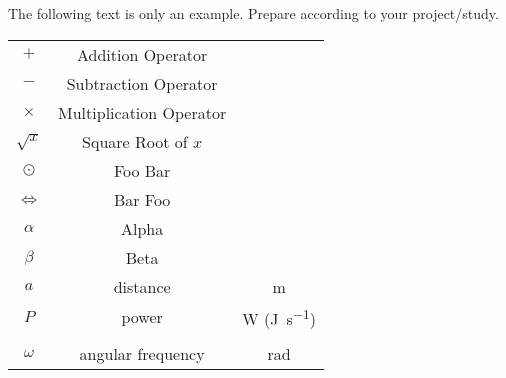 
 {\color{red}The following text is only an example. Prepare according to your project/study.}
\medskip

\begin{tabular}{c c c}

    $+$ & Addition Operator & \\
    $-$ & Subtraction Operator & \\
    $\times$ & Multiplication Operator & \\
    $\sqrt{x}$ & Square Root of $x$ & \\
    $\odot$ & Foo Bar & \\
    $\Leftrightarrow$ & Bar Foo & \\
    $\alpha$ & Alpha & \\
    $\beta$ & Beta & \\
    $a$ & distance & \si{\meter} \\
    $P$ & power & \si{\watt} (\si{\joule\per\second}) \\
    
    
   \\ %
    
    $\omega$ & angular frequency & \si{\radian} \\
\end{tabular}
